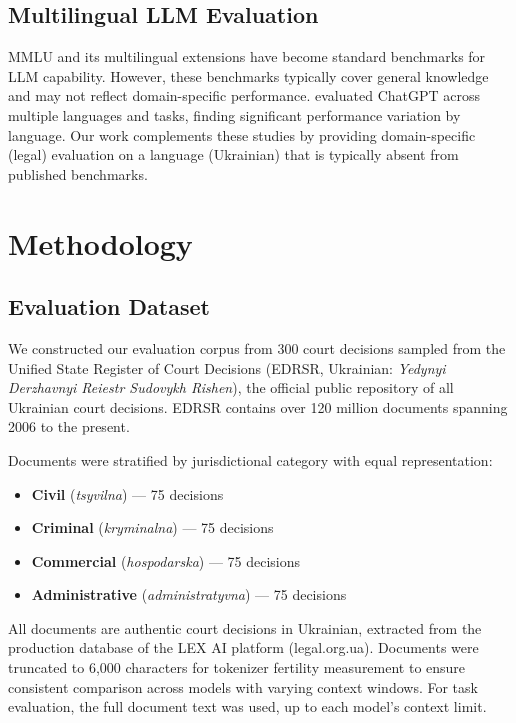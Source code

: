 \documentclass[11pt,a4paper]{article}
\begin{document}
\subsection{Multilingual LLM Evaluation}

MMLU \citep{hendrycks2021measuring} and its multilingual extensions have become standard benchmarks for LLM capability. However, these benchmarks typically cover general knowledge and may not reflect domain-specific performance. \citet{lai2023chatgpt} evaluated ChatGPT across multiple languages and tasks, finding significant performance variation by language. Our work complements these studies by providing domain-specific (legal) evaluation on a language (Ukrainian) that is typically absent from published benchmarks.

\section{Methodology}

\subsection{Evaluation Dataset}
\label{sec:dataset}

We constructed our evaluation corpus from 300 court decisions sampled from the Unified State Register of Court Decisions (EDRSR, Ukrainian: \textit{Yedynyi Derzhavnyi Reiestr Sudovykh Rishen}), the official public repository of all Ukrainian court decisions. EDRSR contains over 120 million documents spanning 2006 to the present.

Documents were stratified by jurisdictional category with equal representation:

\begin{itemize}[leftmargin=*]
    \item \textbf{Civil} (\textit{tsyvilna}) --- 75 decisions
    \item \textbf{Criminal} (\textit{kryminalna}) --- 75 decisions
    \item \textbf{Commercial} (\textit{hospodarska}) --- 75 decisions
    \item \textbf{Administrative} (\textit{administratyvna}) --- 75 decisions
\end{itemize}

All documents are authentic court decisions in Ukrainian, extracted from the production database of the LEX AI platform (legal.org.ua). Documents were truncated to 6,000 characters for tokenizer fertility measurement to ensure consistent comparison across models with varying context windows. For task evaluation, the full document text was used, up to each model's context limit.
\end{document}
